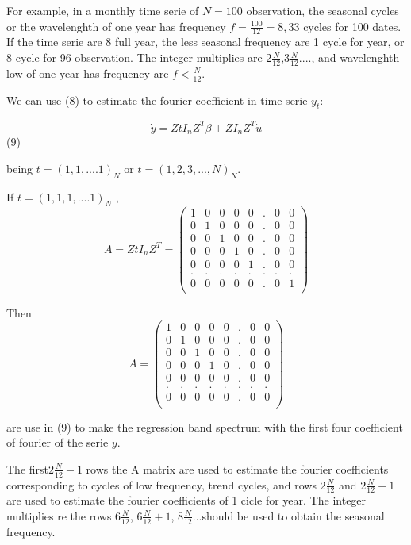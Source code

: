 \documentclass{article}\usepackage[]{graphicx}\usepackage[]{color}
\begin{document}
For example, in a monthly time serie of $N=100$ observation, the seasonal cycles or the wavelenghth of one year has frequency $f= \frac{100}{12}=8,33$ cycles for 100 dates. If the time serie are 8 full year, the less seasonal frequency are 1 cycle for year, or 8 cycle for 96 observation. The integer multiplies are  $2 \frac{N}{12}$,$3 \frac{N}{12}$...., and  wavelenghth low of one year has frequency are $f<\frac{N}{12}$.

We can use (8) to estimate the fourier coefficient in time serie $y_t$:

$$\dot y=Z t I_nZ^T\dot \beta + ZI_nZ^T\dot u$$ (9)

being $t=(1,1,....1)_N$ or $t=(1,2,3,...,N)_N$.

If $t=(1,1,1,....1)_N$ , 
$$A=Z t I_nZ^T=\left(
\begin{array}{cccccccc}
1& 0& 0& 0 & 0 & . & 0& 0 \\
0& 1& 0& 0 & 0 & . & 0& 0 \\
0& 0& 1& 0 & 0 & . & 0& 0 \\
0& 0& 0& 1 & 0 & .& 0& 0 \\
0& 0& 0& 0 & 1 & . & 0& 0 \\
.& .& .& . & . & .& .& . \\
0& 0& 0& 0 & 0 & . & 0& 1 \\
\end{array}
\right)$$ 

Then $$A=\left(
\begin{array}{cccccccc}
1& 0& 0& 0 & 0 & . & 0& 0 \\
0& 1& 0& 0 & 0 & . & 0& 0 \\
0& 0& 1& 0 & 0 & . & 0& 0 \\
0& 0& 0& 1 & 0 & .& 0& 0 \\
0& 0& 0& 0 & 0 & . & 0& 0 \\
.& .& .& . & . & .& .& . \\
0& 0& 0& 0 & 0 & . & 0& 0 \\
\end{array}
\right) $$

are use in (9) to make the  regression band spectrum with the first four coefficient of fourier of the serie $\dot y$.

The  first$2\frac{N}{12}-1$ rows the A matrix are used to estimate the fourier coefficients corresponding to cycles of low frequency, trend cycles, and rows $2 \frac{N}{12}$ and $2 \frac{N}{12}+1$ are used to  estimate the fourier coefficients of 1 cicle for year.  The integer multiplies re the rows   $6 \frac{N}{12}$, $6 \frac{N}{12}+1$, $8 \frac{N}{12}$...should be used to obtain the seasonal frequency.
\end{document}
